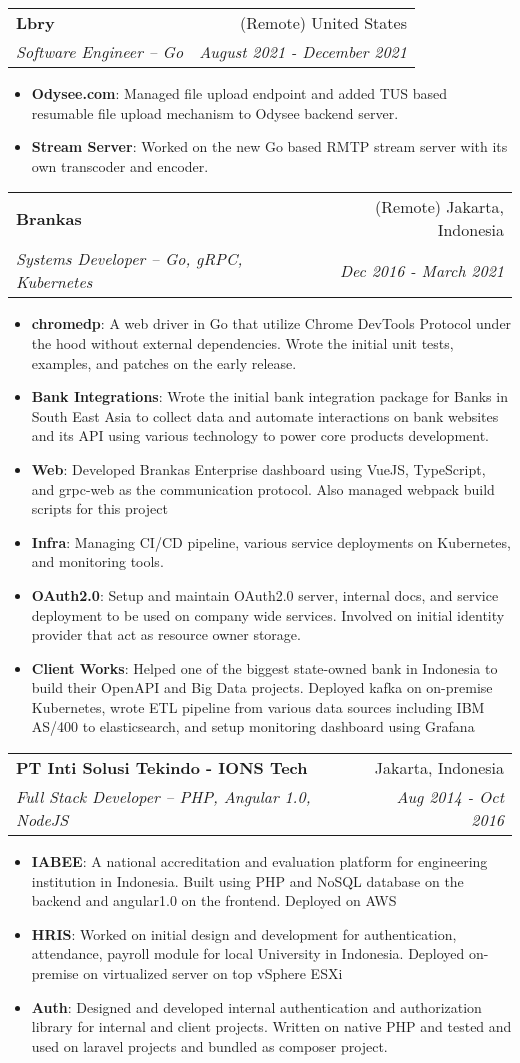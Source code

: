 \documentclass[letterpaper,11pt]{article}
\makeatletter
\newcommand{\resumeItem}[2]{
  \item\small{
      \textbf{#1}{: #2 \vspace{-2pt}}
    }
    }
\newcommand{\resumeSubheading}[4]{
    \vspace{-1pt}\item
      \begin{tabular*}{0.97\textwidth}[t]{l@{\extracolsep{\fill}}r}
        \textbf{#1} & #2 \\
        \textit{\small#3} & \textit{\small #4} \\
      \end{tabular*}\vspace{-5pt}
      }
\newcommand{\resumeItemListStart}{\begin{itemize}}
\newcommand{\resumeItemListEnd}{\end{itemize}\vspace{-5pt}}
\makeatother
\begin{document}
      \resumeSubheading
      {Lbry}{(Remote) United States}
      {Software Engineer -- Go}{August 2021 - December 2021}
      \resumeItemListStart
      \resumeItem{Odysee.com}
      {Managed file upload endpoint and added TUS based resumable file upload mechanism to Odysee backend server.}
      \resumeItem{Stream Server}
      {Worked on the new Go based RMTP stream server with its own transcoder and encoder.}
      \resumeItemListEnd

      \resumeSubheading
      {Brankas}{(Remote) Jakarta, Indonesia}
      {Systems Developer -- Go, gRPC, Kubernetes}{Dec 2016 - March 2021}
      \resumeItemListStart
      \resumeItem {chromedp}
      {A web driver in Go that utilize Chrome DevTools Protocol under the hood without external dependencies. Wrote the initial unit tests, examples, and patches on the early release.}
      \resumeItem {Bank Integrations}
      {Wrote the initial bank integration package for Banks in South East Asia to collect data and automate interactions on bank websites and its API using various technology to power core products development. }
      \resumeItem{Web}
      {Developed Brankas Enterprise dashboard using VueJS, TypeScript, and grpc-web as the communication protocol. Also managed webpack build scripts for this project}
      \resumeItem{Infra}
      {Managing CI/CD pipeline, various service deployments on Kubernetes, and monitoring tools.}
      \resumeItem{OAuth2.0}
      {Setup and maintain OAuth2.0 server, internal docs, and service deployment to be used on company wide services. Involved on initial identity provider that act as resource owner storage.}
      \resumeItem{Client Works}
      {Helped one of the biggest state-owned bank in Indonesia to build their OpenAPI and Big Data projects. Deployed kafka on on-premise Kubernetes, wrote ETL pipeline from various data sources including IBM AS/400 to elasticsearch, and setup monitoring dashboard using Grafana}
      \resumeItemListEnd

      \resumeSubheading
      {PT Inti Solusi Tekindo - IONS Tech}{Jakarta, Indonesia}
      {Full Stack Developer -- PHP, Angular 1.0,  NodeJS}{Aug 2014 - Oct 2016}
      \resumeItemListStart
      \resumeItem{IABEE}
      {A national accreditation and evaluation platform for engineering institution in Indonesia. \newline Built using PHP and NoSQL database on the backend and angular1.0 on the frontend. Deployed on AWS}
      \resumeItem{HRIS}
      {Worked on initial design and development for authentication, attendance, payroll module for local University in Indonesia. Deployed on-premise on virtualized server on top  vSphere ESXi}
      \resumeItem{Auth}
      {Designed and developed internal authentication and authorization library for internal and client projects. Written on native PHP and tested and used on laravel projects and bundled as composer project.}
      \resumeItemListEnd
\end{document}
